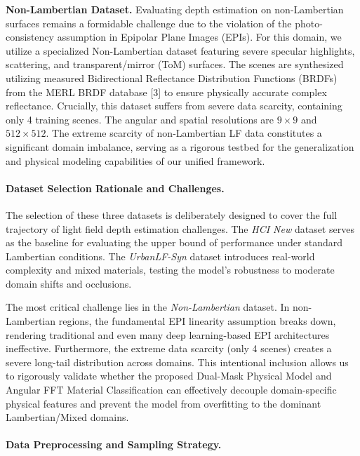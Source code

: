 \textbf{Non-Lambertian Dataset.} Evaluating depth estimation on non-Lambertian surfaces remains a formidable challenge due to the violation of the photo-consistency assumption in Epipolar Plane Images (EPIs). For this domain, we utilize a specialized Non-Lambertian dataset featuring severe specular highlights, scattering, and transparent/mirror (ToM) surfaces. The scenes are synthesized utilizing measured Bidirectional Reflectance Distribution Functions (BRDFs) from the MERL BRDF database [3] to ensure physically accurate complex reflectance. Crucially, this dataset suffers from severe data scarcity, containing only 4 training scenes. The angular and spatial resolutions are $9 \times 9$ and $512 \times 512$. The extreme scarcity of non-Lambertian LF data constitutes a significant domain imbalance, serving as a rigorous testbed for the generalization and physical modeling capabilities of our unified framework.

\paragraph{Dataset Selection Rationale and Challenges.}

The selection of these three datasets is deliberately designed to cover the full trajectory of light field depth estimation challenges. The \textit{HCI New} dataset serves as the baseline for evaluating the upper bound of performance under standard Lambertian conditions. The \textit{UrbanLF-Syn} dataset introduces real-world complexity and mixed materials, testing the model's robustness to moderate domain shifts and occlusions. 

The most critical challenge lies in the \textit{Non-Lambertian} dataset. In non-Lambertian regions, the fundamental EPI linearity assumption breaks down, rendering traditional and even many deep learning-based EPI architectures ineffective. Furthermore, the extreme data scarcity (only 4 scenes) creates a severe long-tail distribution across domains. This intentional inclusion allows us to rigorously validate whether the proposed Dual-Mask Physical Model and Angular FFT Material Classification can effectively decouple domain-specific physical features and prevent the model from overfitting to the dominant Lambertian/Mixed domains.

\paragraph{Data Preprocessing and Sampling Strategy.}

